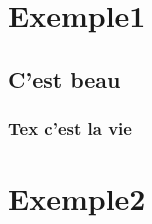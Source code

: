 \documentclass[12pt,twoside]{scrreprt}
\date{Avril 2016}
\author{Direction des opérations}
\begin{document}
% 

\tableofcontents

\chapter{Exemple1}
\section{C'est beau}
\subsection{Tex c'est la vie}
\chapter{Exemple2}
%

% 










\end{document}
